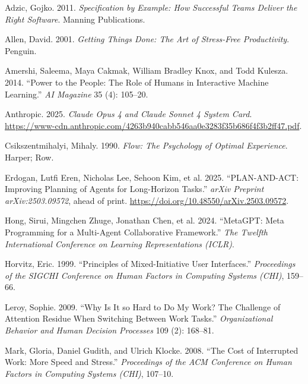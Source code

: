 \documentclass[
  nonatbib,
  preprint]{article}
\newlength{\cslhangindent}
\newenvironment{CSLReferences}[2] %
 {\begin{list}{}{%
  \setlength{\itemindent}{0pt}
  \setlength{\leftmargin}{0pt}
  \setlength{\parsep}{0pt}
  \ifodd #1
   \setlength{\leftmargin}{\cslhangindent}
   \setlength{\itemindent}{-1\cslhangindent}
  \fi
  \setlength{\itemsep}{#2\baselineskip}}}
 {\end{list}}
\begin{document}
\protect{}\label{refs}
\begin{CSLReferences}{1}{1}
Adzic, Gojko. 2011. \emph{Specification by Example: How Successful Teams
Deliver the Right Software}. Manning Publications.

Allen, David. 2001. \emph{Getting Things Done: The Art of Stress-Free
Productivity}. Penguin.

Amershi, Saleema, Maya Cakmak, William Bradley Knox, and Todd Kulesza.
2014. {``Power to the People: The Role of Humans in Interactive Machine
Learning.''} \emph{AI Magazine} 35 (4): 105--20.

Anthropic. 2025. \emph{Claude Opus 4 and Claude Sonnet 4 System Card}.
\url{https://www-cdn.anthropic.com/4263b940cabb546aa0e3283f35b686f4f3b2ff47.pdf}.

Csikszentmihalyi, Mihaly. 1990. \emph{Flow: The Psychology of Optimal
Experience}. Harper; Row.

Erdogan, Lutfi Eren, Nicholas Lee, Sehoon Kim, et al. 2025.
{``{PLAN-AND-ACT}: Improving Planning of Agents for Long-Horizon
Tasks.''} \emph{arXiv Preprint arXiv:2503.09572}, ahead of print.
\url{https://doi.org/10.48550/arXiv.2503.09572}.

Hong, Sirui, Mingchen Zhuge, Jonathan Chen, et al. 2024. {``{MetaGPT}:
Meta Programming for a Multi-Agent Collaborative Framework.''} \emph{The
Twelfth International Conference on Learning Representations (ICLR)}.

Horvitz, Eric. 1999. {``Principles of Mixed-Initiative User
Interfaces.''} \emph{Proceedings of the SIGCHI Conference on Human
Factors in Computing Systems (CHI)}, 159--66.

Leroy, Sophie. 2009. {``Why Is It so Hard to Do My Work? The Challenge
of Attention Residue When Switching Between Work Tasks.''}
\emph{Organizational Behavior and Human Decision Processes} 109 (2):
168--81.

Mark, Gloria, Daniel Gudith, and Ulrich Klocke. 2008. {``The Cost of
Interrupted Work: More Speed and Stress.''} \emph{Proceedings of the ACM
Conference on Human Factors in Computing Systems (CHI)}, 107--10.


\end{CSLReferences}
\end{document}
